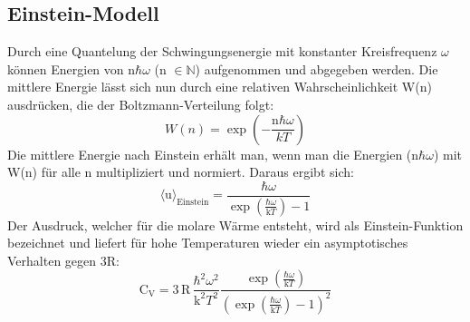 \subsection{Einstein-Modell}
\label{sec:Einstein-Modell}
Durch eine Quantelung der Schwingungsenergie mit konstanter Kreisfrequenz $\omega$
können Energien von n$\hbar\omega$ (n $\in \mathds{N}$) aufgenommen und abgegeben werden.
Die mittlere Energie lässt sich nun durch eine relativen Wahrscheinlichkeit W(n)
ausdrücken, die der Boltzmann-Verteilung folgt:
\begin{equation}
  W(n) = \exp{\left(-\frac{\text{n}\hbar\omega}{kT}\right)}
\end{equation}
Die mittlere Energie nach Einstein erhält man, wenn man die Energien (n$\hbar\omega$)
mit W(n) für alle n multipliziert und normiert. Daraus ergibt sich:
\begin{equation}
  \langle \text{u} \rangle_\text{Einstein} = \frac{\hbar\omega}{\exp{\left(\frac{\hbar\omega}{\text{k}T}\right)}-1}
\end{equation}
Der Ausdruck, welcher für die molare Wärme entsteht, wird als Einstein-Funktion bezeichnet
und liefert für hohe Temperaturen wieder ein asymptotisches Verhalten gegen 3R:
\begin{equation}
  \text{C}_\text{V} = 3\,\text{R}\,\frac{\hbar^2\omega^2}{\text{k}^2T^2}\frac{\exp{\left(\frac{\hbar\omega}{\text{k}T}\right)}}{(\exp{\left(\frac{\hbar\omega}{\text{k}T}\right)}-1)^2}
\end{equation}

